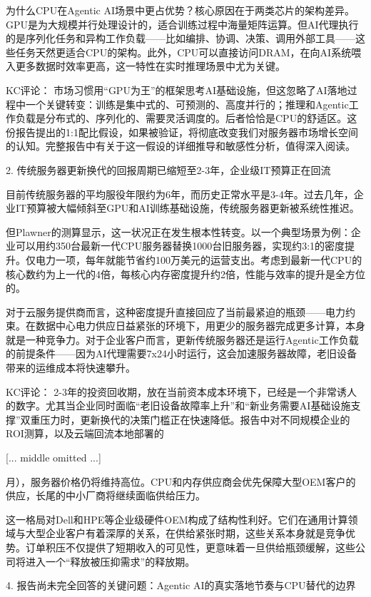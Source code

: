 \documentclass[11pt]{ctexart}
\begin{document}
为什么CPU在Agentic AI场景中更占优势？核心原因在于两类芯片的架构差异。GPU是为大规模并行处理设计的，适合训练过程中海量矩阵运算。但AI代理执行的是序列化任务和异构工作负载——比如编排、协调、决策、调用外部工具——这些任务天然更适合CPU的架构。此外，CPU可以直接访问DRAM，在向AI系统喂入更多数据时效率更高，这一特性在实时推理场景中尤为关键。

KC评论： 市场习惯用“GPU为王”的框架思考AI基础设施，但这忽略了AI落地过程中一个关键转变：训练是集中式的、可预测的、高度并行的；推理和Agentic工作负载是分布式的、序列化的、需要灵活调度的。后者恰恰是CPU的舒适区。这份报告提出的1:1配比假设，如果被验证，将彻底改变我们对服务器市场增长空间的认知。完整报告中有关于这一假设的详细推导和敏感性分析，值得深入阅读。

2. 传统服务器更新换代的回报周期已缩短至2-3年，企业级IT预算正在回流

目前传统服务器的平均服役年限约为6年，而历史正常水平是3-4年。过去几年，企业IT预算被大幅倾斜至GPU和AI训练基础设施，传统服务器更新被系统性推迟。

但Plawner的测算显示，这一状况正在发生根本性转变。以一个典型场景为例：企业可以用约350台最新一代CPU服务器替换1000台旧服务器，实现约3:1的密度提升。仅电力一项，每年就能节省约100万美元的运营支出。考虑到最新一代CPU的核心数约为上一代的4倍，每核心内存密度提升约2倍，性能与效率的提升是全方位的。

对于云服务提供商而言，这种密度提升直接回应了当前最紧迫的瓶颈——电力约束。在数据中心电力供应日益紧张的环境下，用更少的服务器完成更多计算，本身就是一种竞争力。对于企业客户而言，更新传统服务器还是运行Agentic工作负载的前提条件——因为AI代理需要7x24小时运行，这会加速服务器故障，老旧设备带来的运维成本将快速攀升。

KC评论： 2-3年的投资回收期，放在当前资本成本环境下，已经是一个非常诱人的数字。尤其当企业同时面临“老旧设备故障率上升”和“新业务需要AI基础设施支撑”双重压力时，更新换代的决策门槛正在快速降低。报告中对不同规模企业的ROI测算，以及云端回流本地部署的

[... middle omitted ...]

月），服务器价格仍将维持高位。CPU和内存供应商会优先保障大型OEM客户的供应，长尾的中小厂商将继续面临供给压力。

这一格局对Dell和HPE等企业级硬件OEM构成了结构性利好。它们在通用计算领域与大型企业客户有着深厚的关系，在供给紧张时期，这些关系本身就是竞争优势。订单积压不仅提供了短期收入的可见性，更意味着一旦供给瓶颈缓解，这些公司将进入一个“释放被压抑需求”的释放期。

4. 报告尚未完全回答的关键问题：Agentic AI的真实落地节奏与CPU替代的边界
\end{document}
